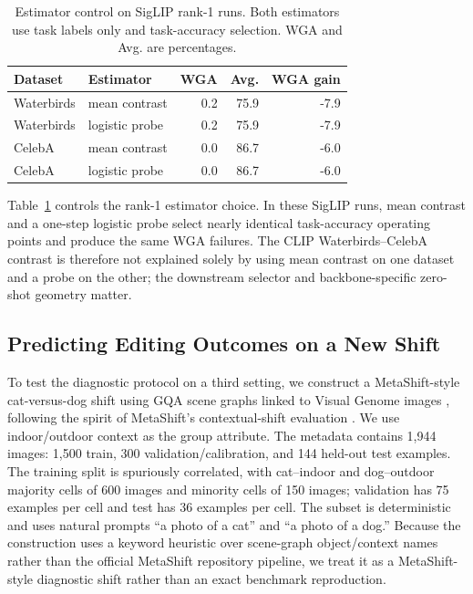 \begin{table}[t]
\centering
\caption{Estimator control on SigLIP rank-1 runs. Both estimators use task labels only and task-accuracy selection. WGA and Avg. are percentages.}
\label{tab:siglip-estimator-control}
\footnotesize
\setlength{\tabcolsep}{4pt}
\begin{tabular*}{\columnwidth}{@{\extracolsep{\fill}}llrrr@{}}
\toprule
Dataset & Estimator & WGA & Avg. & WGA gain \\
\midrule
Waterbirds & mean contrast & 0.2 & 75.9 & -7.9 \\
Waterbirds & logistic probe & 0.2 & 75.9 & -7.9 \\
CelebA & mean contrast & 0.0 & 86.7 & -6.0 \\
CelebA & logistic probe & 0.0 & 86.7 & -6.0 \\
\bottomrule
\end{tabular*}
\end{table}

Table~\ref{tab:siglip-estimator-control} controls the rank-1 estimator choice. In these SigLIP runs, mean contrast and a one-step logistic probe select nearly identical task-accuracy operating points and produce the same WGA failures. The CLIP Waterbirds--CelebA contrast is therefore not explained solely by using mean contrast on one dataset and a probe on the other; the downstream selector and backbone-specific zero-shot geometry matter.

\subsection{Predicting Editing Outcomes on a New Shift}

To test the diagnostic protocol on a third setting, we construct a MetaShift-style cat-versus-dog shift using GQA scene graphs \citep{hudson2019gqa} linked to Visual Genome images \citep{krishna2017visualgenome}, following the spirit of MetaShift's contextual-shift evaluation \citep{liang2022metashift}. We use indoor/outdoor context as the group attribute. The metadata contains 1,944 images: 1,500 train, 300 validation/calibration, and 144 held-out test examples. The training split is spuriously correlated, with cat--indoor and dog--outdoor majority cells of 600 images and minority cells of 150 images; validation has 75 examples per cell and test has 36 examples per cell. The subset is deterministic and uses natural prompts ``a photo of a cat'' and ``a photo of a dog.'' Because the construction uses a keyword heuristic over scene-graph object/context names rather than the official MetaShift repository pipeline, we treat it as a MetaShift-style diagnostic shift rather than an exact benchmark reproduction.

